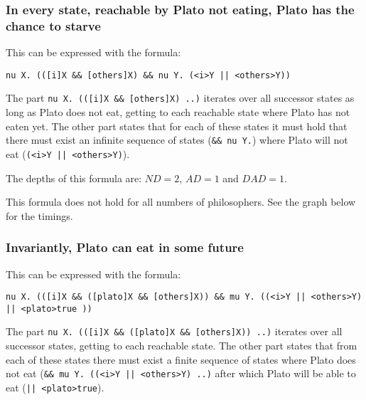 \documentclass[10pt,a4paper]{article}
\begin{document}
\subsubsection{In every state, reachable by Plato not eating, Plato has the chance to starve}
This can be expressed with the formula:

\begin{center}
	{\tt nu X. (([i]X \&\& [others]X) \&\& nu Y. (<i>Y || <others>Y))}
\end{center}

The part {\tt nu X. (([i]X \&\& [others]X) ..)} iterates over all successor states as long as Plato does not eat, getting to each reachable state where Plato has not eaten yet. The other part states that for each of these states it must hold that there must exist an infinite sequence of states ({\tt \&\& nu Y.}) where Plato will not eat ({\tt (<i>Y || <others>Y)}).

The depths of this formula are: $ND = 2$, $AD = 1$ and $DAD = 1$.

This formula does not hold for all numbers of philosophers. See the graph below for the timings.


\subsubsection{Invariantly, Plato can eat in some future}
This can be expressed with the formula:

\begin{center}
	{\tt nu X. (([i]X \&\& ([plato]X \&\& [others]X)) \&\& mu Y. ((<i>Y || <others>Y) || <plato>true ))}
\end{center}

The part {\tt nu X. (([i]X \&\& ([plato]X \&\& [others]X)) ..)} iterates over all successor states, getting to each reachable state. The other part states that from each of these states there must exist a finite sequence of states where Plato does not eat ({\tt \&\& mu Y. ((<i>Y || <others>Y) ..)} after which Plato will be able to eat ({\tt || <plato>true}).
\end{document}
